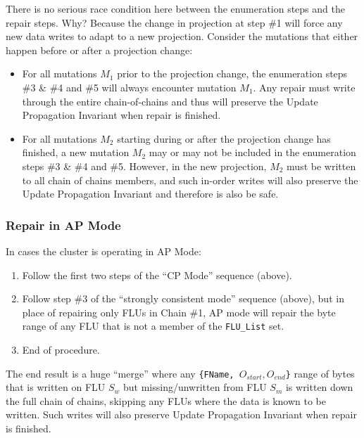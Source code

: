 \documentclass[preprint,10pt]{sigplanconf}
\begin{document}
There is no serious race condition here between the enumeration steps
and the repair steps.  Why?  Because the change in projection at
step \#1 will force any new data writes to adapt to a new projection.
Consider the mutations that either happen before or after a projection
change:

\begin{itemize}

\item For all mutations $M_1$ prior to the projection change, the
  enumeration steps \#3 \& \#4 and \#5 will always encounter mutation
  $M_1$.  Any repair must write through the entire chain-of-chains and
  thus will preserve the Update Propagation Invariant when repair is
  finished.

\item For all mutations $M_2$ starting during or after the projection
  change has finished, a new mutation $M_2$ may or may not be included in the
  enumeration steps \#3 \& \#4 and \#5.
  However, in the new projection, $M_2$ must be
  written to all chain of chains members, and such
  in-order writes will also preserve the Update
  Propagation Invariant and therefore is also be safe.

\end{itemize}

\subsubsection{Repair in AP Mode}

In cases the cluster is operating in AP Mode:

\begin{enumerate}
\item Follow the first two steps of the ``CP Mode''
  sequence (above).
\item Follow step \#3 of the ``strongly consistent mode'' sequence
  (above), but in place of repairing only FLUs in Chain \#1, AP mode
  will repair the byte range of any FLU that is not a member of the
  {\tt FLU\_List} set.
\item End of procedure.
\end{enumerate}

The end result is a huge ``merge'' where any
{\tt \{FName, $O_{start}, O_{end}$\}} range of bytes that is written
on FLU $S_w$ but missing/unwritten from FLU $S_m$ is written down the full chain
of chains, skipping any FLUs where the data is known to be written.
Such writes will also preserve Update Propagation Invariant when
repair is finished.
\end{document}
